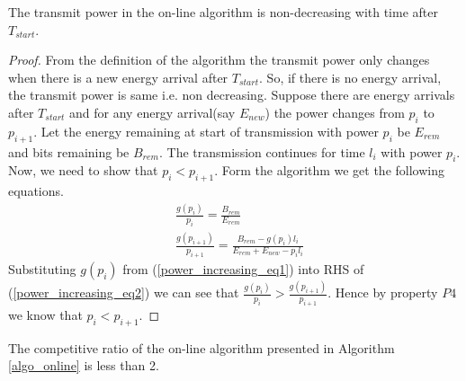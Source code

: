 \begin{lemma}
The transmit power in the on-line algorithm is non-decreasing with time after $T_{start}$.
\label{online_power}
\end{lemma}
\begin{proof}
From the definition of the algorithm the transmit power only changes when there is a new energy arrival after $T_{start}$. So, if there is no energy arrival, the transmit power is same i.e. non decreasing. Suppose there are energy arrivals after $T_{start}$ and for any energy arrival(say $E_{new}$) the power changes from $p_i$ to $p_{i+1}$. Let the energy remaining at start of transmission with power $p_i$ be $E_{rem}$ and bits remaining be $B_{rem}$. The transmission continues for time $l_i$ with power $p_i$. Now, we need to show that $p_i<p_{i+1}$. Form the algorithm we get the following equations. 
\begin{align}
&\frac{g(p_i)}{p_i}=\frac{B_{rem}}{E_{rem}} \label{power_increasing_eq1}
\\
&\frac{g(p_{i+1})}{p_{i+1}}=\frac{B_{rem}-g(p_i) l_i}{E_{rem}+E_{new}-p_i l_i}\label{power_increasing_eq2}
\end{align}
Substituting $g(p_i)$ from (\ref{power_increasing_eq1}) into RHS of (\ref{power_increasing_eq2}) we can see that $\frac{g(p_i)}{p_i}>\frac{g(p_{i+1})}{p_{i+1}}$. Hence by property $P4$ we know that $p_i<p_{i+1}$.
\end{proof}
\begin{theorem}
The competitive ratio of the on-line algorithm presented in Algorithm \ref{algo_online} is less than 2.
\end{theorem}
